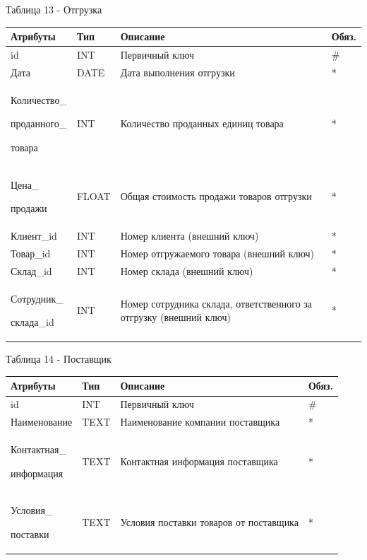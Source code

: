 \documentclass[14pt]{extreport}
\begin{document}
\noindent
Таблица 13 - Отгрузка
\begin{center}
\begin{longtable}{ |m{3.3cm}|m{3cm}|m{6cm}|m{1.8cm}| } 
 \hline
 Атрибуты & Тип & Описание & Обяз. \\ [0.5ex] 
 \hline\hline
 id & INT & Первичный ключ & \# \\
 \hline
 Дата & DATE & Дата выполнения отгрузки & * \\
 \hline
 Количество\_
 
 проданного\_
 
 товара & INT & Количество проданных единиц товара & * \\
 \hline
 Цена\_
 
 продажи & FLOAT & Общая стоимость продажи товаров отгрузки & * \\
 \hline
 Клиент\_id & INT & Номер клиента (внешний ключ) & * \\
 \hline
 Товар\_id & INT & Номер отгружаемого товара (внешний ключ) & * \\
 \hline
 Склад\_id & INT & Номер склада (внешний ключ) & * \\
 \hline
 Сотрудник\_
 
 склада\_id & INT & Номер сотрудника склада, ответственного за отгрузку (внешний ключ) & * \\
 \hline
\end{longtable}
\end{center}



\noindent
Таблица 14 - Поставщик
\begin{center}
\begin{longtable}{ |m{3.3cm}|m{3cm}|m{6cm}|m{1.8cm}| } 
 \hline
 Атрибуты & Тип & Описание & Обяз. \\ [0.5ex] 
 \hline\hline
 id & INT & Первичный ключ & \# \\
 \hline
 Наименование & TEXT & Наименование компании поставщика & * \\
 \hline
 Контактная\_
 
 информация & TEXT & Контактная информация поставщика & * \\
 \hline
 Условия\_
 
 поставки & TEXT & Условия поставки товаров от поставщика & * \\
 \hline
\end{longtable}
\end{center}
\end{document}
